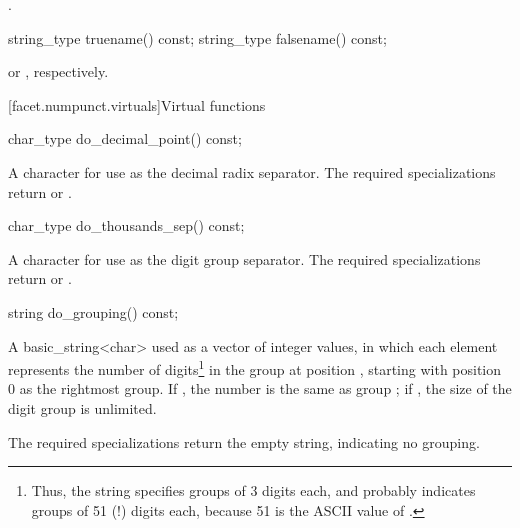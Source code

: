 \begin{itemdescr}
\pnum
\returns
{}.
\end{itemdescr}

%
%
\begin{itemdecl}
string_type truename()  const;
string_type falsename() const;
\end{itemdecl}

\begin{itemdescr}
\pnum
\returns
{}
or
,
respectively.
\end{itemdescr}

[facet.numpunct.virtuals]{Virtual functions}

%
\begin{itemdecl}
char_type do_decimal_point() const;
\end{itemdecl}

\begin{itemdescr}
\pnum
\returns
A character for use as the decimal radix separator.
The required specializations return  or .
\end{itemdescr}

%
\begin{itemdecl}
char_type do_thousands_sep() const;
\end{itemdecl}

\begin{itemdescr}
\pnum
\returns
A character for use as the digit group separator.
The required specializations return  or .
\end{itemdescr}

%
\begin{itemdecl}
string do_grouping() const;
\end{itemdecl}

\begin{itemdescr}
\pnum
\returns
A basic_string<char>  used as a vector of integer values,
in which each element
represents the number of digits\footnote{Thus, the string
 specifies groups of 3 digits each, and
 probably indicates groups of 51 (!) digits each,
because 51 is the ASCII value of .}
in the group at position , starting with position 0 as the
rightmost group.
If
,
the number is the same as group
;
if
,
the size of the digit group is unlimited.

\pnum
The required specializations return the empty string, indicating
no grouping.
\end{itemdescr}

